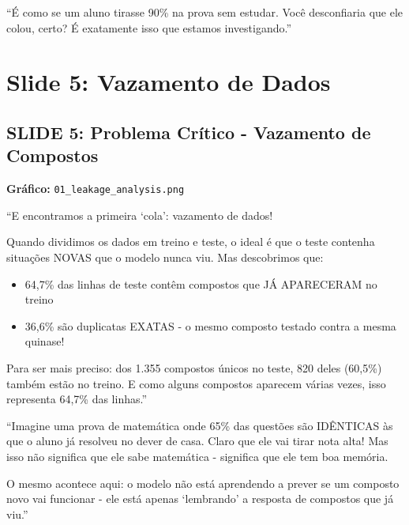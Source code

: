 \documentclass[11pt,a4paper]{article}
\begin{document}
\begin{analogia}
``É como se um aluno tirasse 90\% na prova sem estudar. Você desconfiaria que ele colou, certo? É exatamente isso que estamos investigando.''
\end{analogia}

\section{Slide 5: Vazamento de Dados}

\subsection{SLIDE 5: Problema Crítico - Vazamento de Compostos}

\textbf{Gráfico:} \texttt{01\_leakage\_analysis.png}

\begin{oquedizer}
``E encontramos a primeira `cola': vazamento de dados!

Quando dividimos os dados em treino e teste, o ideal é que o teste contenha situações NOVAS que o modelo nunca viu. Mas descobrimos que:
\begin{itemize}
    \item 64,7\% das linhas de teste contêm compostos que JÁ APARECERAM no treino
    \item 36,6\% são duplicatas EXATAS - o mesmo composto testado contra a mesma quinase!
\end{itemize}

Para ser mais preciso: dos 1.355 compostos únicos no teste, 820 deles (60,5\%) também estão no treino. E como alguns compostos aparecem várias vezes, isso representa 64,7\% das linhas.''
\end{oquedizer}

\begin{analogia}
``Imagine uma prova de matemática onde 65\% das questões são IDÊNTICAS às que o aluno já resolveu no dever de casa. Claro que ele vai tirar nota alta! Mas isso não significa que ele sabe matemática - significa que ele tem boa memória.

O mesmo acontece aqui: o modelo não está aprendendo a prever se um composto novo vai funcionar - ele está apenas `lembrando' a resposta de compostos que já viu.''
\end{analogia}
\end{document}
